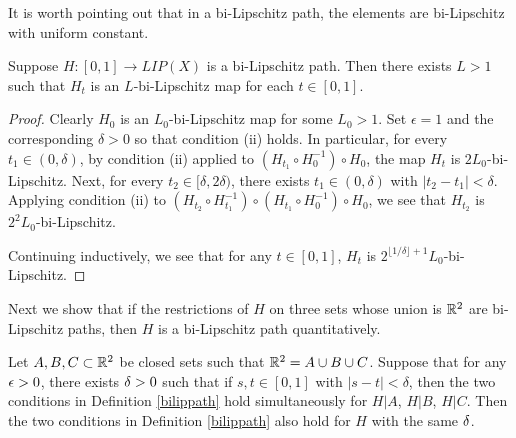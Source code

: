 \documentclass{amsart}
\begin{document}
It is worth pointing out that in a bi-Lipschitz path, the elements are bi-Lipschitz with uniform constant.

\begin{lemma}
\label{lem:pathbound}
Suppose $H:[0,1] \to LIP(X)$ is a bi-Lipschitz path. Then there exists $L>1$ such that $H_t$ is an $L$-bi-Lipschitz map for each $t\in [0,1]$.
\end{lemma}

\begin{proof}
Clearly $H_0$ is an $L_0$-bi-Lipschitz map for some $L_0>1$. Set $\epsilon =1$ and the corresponding $\delta>0$ so that condition (ii) holds. In particular, for every $t_1\in(0,\delta)$, by condition (ii) applied to $(H_{t_1} \circ H_0^{-1}) \circ H_0$, the map $H_t$ is $2L_0$-bi-Lipschitz. Next, for every $t_2\in [\delta, 2\delta)$, there exists $t_1 \in(0,\delta)$ with $|t_2 - t_1| < \delta$. Applying condition (ii) to $(H_{t_2} \circ H_{t_1}^{-1}) \circ  ( H_{t_1} \circ H_0^{-1}) \circ H_0$, we see that $H_{t_2}$ is $2^2L_0$-bi-Lipschitz.

Continuing inductively, we see that for any $t\in [0,1]$, $H_t$ is $2^{\lfloor1/\delta \rfloor +1} L_0$-bi-Lipschitz.
\end{proof}

Next we show that if the restrictions of $H$ on three sets whose union is $\mathbb{R}^2$ are bi-Lipschitz paths, then $H$ is a bi-Lipschitz path quantitatively.

\begin{lemma}\label{lem:partition}
Let $A,B,C \subset \mathbb{R}^2$ be closed sets such that $\mathbb{R}^2 = A\cup B\cup C$. Suppose that for any $\epsilon>0$, there exists $\delta>0$ such that if $s,t\in [0,1]$ with $|s-t| <\delta$, then the two conditions in Definition \ref{bilippath} hold simultaneously for $H|A$, $H|B$, $H|C$. Then
the two conditions in Definition \ref{bilippath} also hold for $H$ with the same $\delta$.
\end{lemma}
\end{document}
